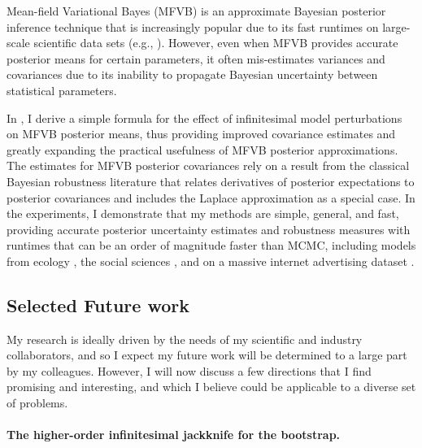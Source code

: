 Mean-field Variational Bayes (MFVB) is an approximate Bayesian posterior
inference technique that is increasingly popular due to its fast runtimes on
large-scale scientific data sets (e.g., \citet{raj:2014:faststructure,
kucukelbir:2017:advi, regier:2019:cataloging}). However, even when MFVB provides
accurate posterior means for certain parameters, it often mis-estimates
variances and covariances \citep{wang:2005:inadequacy, turner:2011:two} due to
its inability to propagate Bayesian uncertainty between statistical parameters.

In \citet{giordano:2015:linear, giordano:2018:covariances}, I derive a simple
formula for the effect of infinitesimal model perturbations on MFVB posterior
means, thus providing improved covariance estimates and greatly expanding the
practical usefulness of MFVB posterior approximations. The estimates for MFVB
posterior covariances rely on a result from the classical Bayesian robustness
literature that relates derivatives of posterior expectations to posterior
covariances and includes the Laplace approximation as a special case.
In the experiments, I demonstrate that my methods are simple, general, and
fast, providing accurate posterior uncertainty estimates and robustness measures
with runtimes that can be an order of magnitude faster than MCMC, including
models from ecology \citep{kery:2011:bayesian}, the social sciences
\citep{gelman:2006:arm}, and on a massive internet advertising dataset
\citep{criteo:2014:dataset}.




\subsection*{Selected Future work}

My research is ideally driven by the needs of my scientific and industry
collaborators, and so I expect my future work will be determined to a large part
by my colleagues.  However, I will now discuss a few directions that I find
promising and interesting, and which I believe could be applicable to a diverse
set of problems.

\paragraph{The higher-order infinitesimal jackknife for the bootstrap.}

